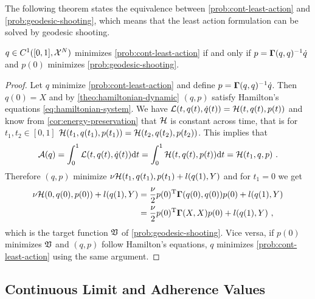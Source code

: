 The following theorem states the equivalence between \cref{prob:cont-least-action} and \cref{prob:geodesic-shooting}, which means that the least action formulation can be solved by geodesic shooting.
\begin{theorem}
	\label{theo:geodesic-shooting}
	$q \in C^1([0, 1], \mathcal{X}^N)$ minimizes \cref{prob:cont-least-action} if and only if $p = \mathbf{\Gamma}(q, q)^{-1}\dot{q}$ and $p(0)$ minimizes \cref{prob:geodesic-shooting}.
\end{theorem}
\begin{proof}
	Let $q$ minimize \cref{prob:cont-least-action} and define $p = \mathbf{\Gamma}(q, q)^{-1}\dot{q}$.
	Then $q(0) = X$ and by \cref{theo:hamiltonian-dynamic} $(q, p)$ satisfy Hamilton's equations \ref{eq:hamiltonian-system}.
	We have $\mathcal{L}(t, q(t), \dot{q}(t)) = \mathcal{H}(t, q(t), p(t))$ and know from \cref{cor:energy-preservation} that $\mathcal{H}$ is constant across time, that is for $t_1, t_2 \in [0, 1]$ $\mathcal{H}(t_1, q(t_1), p(t_1)) = \mathcal{H}(t_2, q(t_2), p(t_2))$.
	This implies that
	\begin{equation}
	\mathcal{A}(q) = \int_{0}^{1} \cL(t, q(t), \dot{q}(t)) \mathrm{d}t 
	= \int_{0}^{1} \cH(t, q(t), p(t)) \mathrm{d}t = \cH(t_1, q, p) \ .
	\end{equation}
	Therefore $(q, p)$ minimize $\nu \mathcal{H}(t_1, q(t_1), p(t_1) + l(q(1), Y)$ and for $t_1 = 0$ we get
	\begin{align}
	\nu \mathcal{H}(0, q(0), p(0)) + l(q(1), Y) &= \frac{\nu}{2} p(0)^{\mathrm{T}} \mathbf{\Gamma}(q(0), q(0))p(0) + l(q(1), Y)\\
	&= \frac{\nu}{2} p(0)^{\mathrm{T}} \mathbf{\Gamma}(X, X)p(0) + l(q(1), Y) \ ,
	\end{align}
	which is the target function $\mathfrak{V}$ of \cref{prob:geodesic-shooting}.
	Vice versa, if $p(0)$ minimizes $\mathfrak{V}$ and $(q, p)$ follow Hamilton's equations, $q$ minimizes \cref{prob:cont-least-action} using the same argument.
\end{proof}

\subsection{Continuous Limit and Adherence Values}

